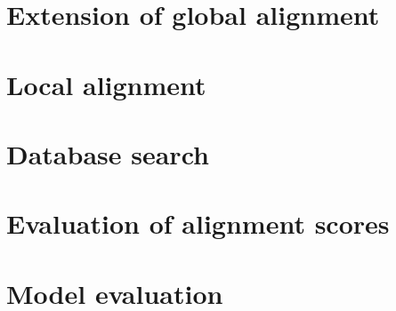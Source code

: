 \documentclass[12pt]{article}
\begin{document}
\section{Extension of global alignment}







\newpage

%
%
\setcounter{figure}{0}
\setcounter{table}{0}
\section{Local alignment}




\newpage

%
%
\setcounter{figure}{0}
\setcounter{table}{0}
\section{Database search}







\newpage
%
%
\setcounter{figure}{0}
\setcounter{table}{0}
\section{Evaluation of alignment scores}






\newpage

%
%
\setcounter{figure}{0}
\setcounter{table}{0}
\section{Model evaluation}


\newpage



\newpage
\end{document}

